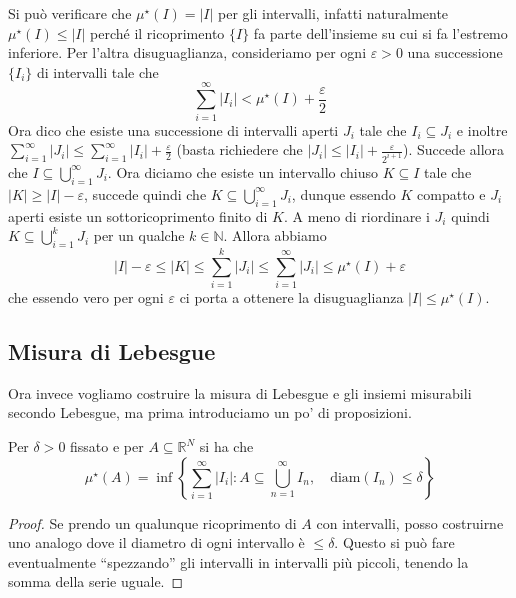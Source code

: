 Si può verificare che \(\mu^\star(I) = |I|\) per gli intervalli, infatti
naturalmente \(\mu^\star(I) \le |I|\) perché il ricoprimento \(\{I\} \) fa parte
dell'insieme su cui si fa l'estremo inferiore. Per l'altra disuguaglianza, consideriamo per
ogni \(\varepsilon>0\) una successione \(\{I_{i}\} \) di intervalli tale che 
\[
    \sum_{i=1}^{\infty} |I_{i}| < \mu^\star(I) + \frac{\varepsilon}{2}
\]
Ora dico che esiste una successione di intervalli aperti \(J_{i}\) tale che
\(I_{i} \subseteq J_{i} \) e inoltre \(\sum_{i=1}^{\infty} |J_{i}| \le
\sum_{i=1}^{\infty} |I_{i}| + \frac{\varepsilon}{2} \) (basta richiedere che
\(|J_{i}| \le |I_{i}| + \frac{\varepsilon}{2^{i+1}}\)). Succede allora che \(I
\subseteq \bigcup_{i=1}^{\infty}J_{i}  \). Ora diciamo che esiste un intervallo
chiuso \(K \subseteq I \) tale che \(|K| \ge |I| - \varepsilon\), succede quindi
che \(K \subseteq \bigcup_{i = 1}^{\infty}J_{i}\), dunque essendo \(K\) compatto
e \(J_{i}\) aperti esiste un sottoricoprimento finito di \(K\). A meno di
riordinare i \(J_{i}\) quindi \(K \subseteq \bigcup_{i = 1}^{k} J_{i}  \) per un
qualche \(k \in \mathbb{N}\). Allora abbiamo
\[
    |I| - \varepsilon \le  |K| \le \sum_{i=1}^{k} |J_{i}| \le
    \sum_{i=1}^{\infty} |J_{i}| \le \mu^\star(I) + \varepsilon
\]
che essendo vero per ogni \(\varepsilon\) ci porta a ottenere la disuguaglianza
\(|I| \le \mu^\star(I)\).

\subsection{Misura di Lebesgue}
Ora invece vogliamo costruire la misura di Lebesgue e gli
insiemi misurabili secondo Lebesgue, ma prima introduciamo un po' di
proposizioni.
\begin{proposition}\label{prop:prop_1}
    Per \(\delta > 0\) fissato e per \(A \subseteq \mathbb{R}^{N} \) si ha che 
    \[
        \mu^\star(A) = \inf\left\{ \sum_{i=1}^{\infty} |I_{i}| : A \subseteq
            \bigcup_{n = 1}^{\infty} I_{n}, \quad \text{diam}(I_{n}) \le \delta
        \right\}
    \]
\end{proposition}
\begin{proof}
    Se prendo un qualunque ricoprimento di \(A\) con intervalli, posso
    costruirne uno analogo dove il diametro di ogni intervallo è \(\le \delta\).
    Questo si può fare eventualmente ``spezzando'' gli intervalli in intervalli
    più piccoli, tenendo la somma della serie uguale.
\end{proof}

